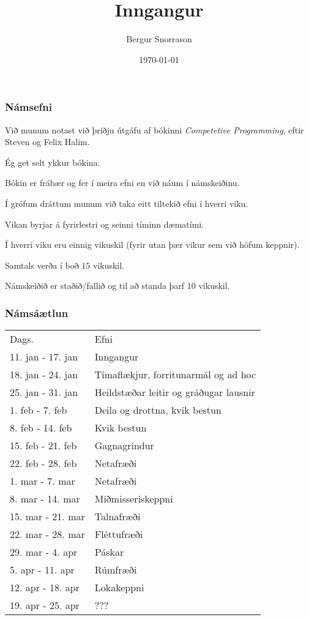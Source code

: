\title{Inngangur}
\author{Bergur Snorrason}
\date{\today}



\frame{\titlepage}

{
	\frametitle{Námsefni}
	{
		\item<1-> Við munum notast við þriðju útgáfu af bókinni \emph{Competetive Programming}, eftir Steven og Felix Halim.
		\item<2-> Ég get selt ykkur bókina.
		\item<3-> Bókin er frábær og fer í meira efni en við náum í námskeiðinu.
		\item<4-> Í grófum dráttum munum við taka eitt tiltekið efni í hverri viku.
		\item<5-> Vikan byrjar á fyrirlestri og seinni tíminn dæmatími.
		\item<6-> Í hverri viku eru einnig vikuskil (fyrir utan þær vikur sem við höfum keppnir).
		\item<7-> Samtals verða í boð $15$ vikuskil.
		\item<8-> Námskeiðið er staðið/fallið og til að standa þarf $10$ vikuskil.
	}
}

{
	\frametitle{Námsáætlun}
	\begin{tabular}{l l}
		Dags. & Efni\\
		11. jan - 17. jan & Inngangur\\
		18. jan - 24. jan & Tímaflækjur, forritunarmál og ad hoc\\
		25. jan - 31. jan & Heildstæðar leitir og gráðugar lausnir\\
		1. feb - 7. feb & Deila og drottna, kvik bestun\\
		8. feb - 14. feb & Kvik bestun\\
		15. feb - 21. feb & Gagnagrindur\\
		22. feb - 28. feb & Netafræði\\
		1. mar - 7. mar & Netafræði\\
		8. mar - 14. mar & Miðmisseriskeppni\\
		15. mar - 21. mar & Talnafræði\\
		22. mar - 28. mar & Fléttufræði\\
		29. mar - 4. apr & Páskar\\
		5. apr - 11. apr & Rúmfræði\\
		12. apr - 18. apr & Lokakeppni\\
		19. apr - 25. apr & ???
	\end{tabular}
}

